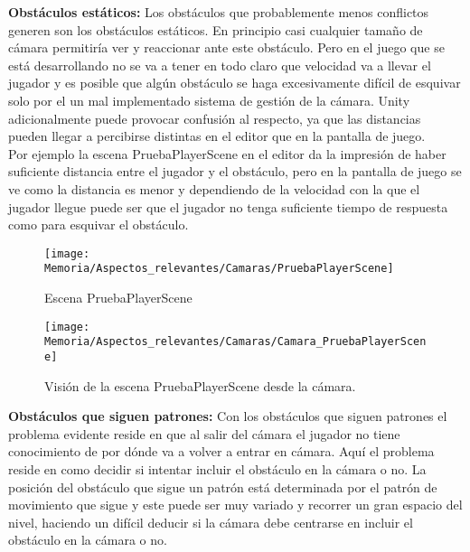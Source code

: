 \textbf{Obstáculos estáticos:} Los obstáculos que probablemente menos conflictos generen son los obstáculos estáticos. En principio casi cualquier tamaño de cámara permitiría ver y reaccionar ante este obstáculo. Pero en el juego que se está desarrollando no se va a tener en todo claro que velocidad va a llevar el jugador y es posible que algún obstáculo se haga excesivamente difícil de esquivar solo por el un mal implementado sistema de gestión de la cámara. Unity adicionalmente puede provocar confusión al respecto, ya que las distancias pueden llegar a percibirse distintas en el editor que en la pantalla de juego.\\
Por ejemplo la escena PruebaPlayerScene en el editor da la impresión de haber suficiente distancia entre el jugador y el obstáculo, pero en la pantalla de juego se ve como la distancia es menor y dependiendo de la velocidad con la que el jugador llegue puede ser que el jugador no tenga suficiente tiempo de respuesta como para esquivar el obstáculo.

\begin{figure}[h]
\texttt{[image: Memoria/Aspectos\_relevantes/Camaras/PruebaPlayerScene]}
\caption{Escena PruebaPlayerScene}
\end{figure}

\clearpage
\begin{figure}[h]
\texttt{[image: Memoria/Aspectos\_relevantes/Camaras/Camara\_PruebaPlayerScene]}
\caption{Visión de la escena PruebaPlayerScene desde la cámara.}
\end{figure}

\textbf{Obstáculos que siguen patrones:} Con los obstáculos que siguen patrones el problema evidente reside en que al salir del cámara el jugador no tiene conocimiento de por dónde va a volver a entrar en cámara. Aquí el problema reside en como decidir si intentar incluir el obstáculo en la cámara o no.
La posición del obstáculo que sigue un patrón está determinada por el patrón de movimiento que sigue y este puede ser muy variado y recorrer un gran espacio del nivel, haciendo un difícil deducir si la cámara debe centrarse en incluir el obstáculo en la cámara o no.

